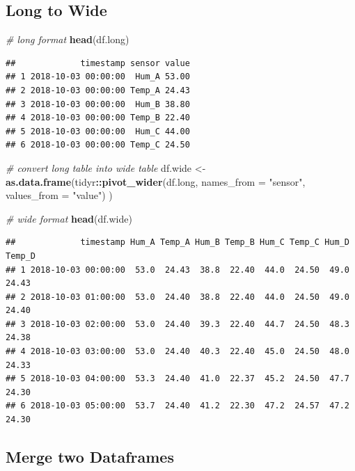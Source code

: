 \documentclass[
]{book}
\newenvironment{Shaded}{\begin{snugshade}}{\end{snugshade}}
\newcommand{\CommentTok}[1]{\textcolor[rgb]{0.56,0.35,0.01}{\textit{#1}}}
\newcommand{\DataTypeTok}[1]{\textcolor[rgb]{0.13,0.29,0.53}{#1}}
\newcommand{\KeywordTok}[1]{\textcolor[rgb]{0.13,0.29,0.53}{\textbf{#1}}}
\newcommand{\NormalTok}[1]{#1}
\newcommand{\OperatorTok}[1]{\textcolor[rgb]{0.81,0.36,0.00}{\textbf{#1}}}
\newcommand{\StringTok}[1]{\textcolor[rgb]{0.31,0.60,0.02}{#1}}
\begin{document}
\hypertarget{long-to-wide}{%
\subsection{Long to Wide}\label{long-to-wide}}

\begin{Shaded}
\begin{Highlighting}[]
\CommentTok{# long format}
\KeywordTok{head}\NormalTok{(df.long)}
\end{Highlighting}
\end{Shaded}

\begin{verbatim}
##             timestamp sensor value
## 1 2018-10-03 00:00:00  Hum_A 53.00
## 2 2018-10-03 00:00:00 Temp_A 24.43
## 3 2018-10-03 00:00:00  Hum_B 38.80
## 4 2018-10-03 00:00:00 Temp_B 22.40
## 5 2018-10-03 00:00:00  Hum_C 44.00
## 6 2018-10-03 00:00:00 Temp_C 24.50
\end{verbatim}

\begin{Shaded}
\begin{Highlighting}[]
\CommentTok{# convert long table into wide table}
\NormalTok{df.wide <-}\StringTok{ }\KeywordTok{as.data.frame}\NormalTok{(tidyr}\OperatorTok{::}\KeywordTok{pivot_wider}\NormalTok{(df.long,}
                                            \DataTypeTok{names_from =} \StringTok{"sensor"}\NormalTok{,}
                                            \DataTypeTok{values_from =} \StringTok{"value"}\NormalTok{)}
\NormalTok{                         )}

\CommentTok{# wide format}
\KeywordTok{head}\NormalTok{(df.wide)}
\end{Highlighting}
\end{Shaded}

\begin{verbatim}
##             timestamp Hum_A Temp_A Hum_B Temp_B Hum_C Temp_C Hum_D Temp_D
## 1 2018-10-03 00:00:00  53.0  24.43  38.8  22.40  44.0  24.50  49.0  24.43
## 2 2018-10-03 01:00:00  53.0  24.40  38.8  22.40  44.0  24.50  49.0  24.40
## 3 2018-10-03 02:00:00  53.0  24.40  39.3  22.40  44.7  24.50  48.3  24.38
## 4 2018-10-03 03:00:00  53.0  24.40  40.3  22.40  45.0  24.50  48.0  24.33
## 5 2018-10-03 04:00:00  53.3  24.40  41.0  22.37  45.2  24.50  47.7  24.30
## 6 2018-10-03 05:00:00  53.7  24.40  41.2  22.30  47.2  24.57  47.2  24.30
\end{verbatim}

\hypertarget{DATAWRANGLING-MERGE-TWO-DATAFRAMES}{%
\subsection{Merge two Dataframes}\label{DATAWRANGLING-MERGE-TWO-DATAFRAMES}}
\end{document}
